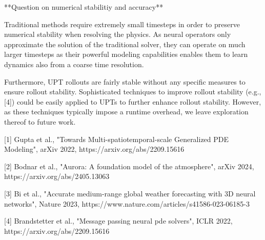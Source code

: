 **Question on numerical stabilitiy and accuracy**

Traditional methods require extremely small timesteps in order to preserve numerical stability when resolving the physics.
As neural operators only approximate the solution of the traditional solver, they can operate on much larger timesteps as their powerful modeling capabilities enables them to learn dynamics also from a coarse time resolution.


Furthermore, UPT rollouts are fairly stable without any specific measures to ensure rollout stability. Sophisticated techniques to improve rollout stability (e.g., [4]) could be easily applied to UPTs to further enhance rollout stability. However, as these techniques typically impose a runtime overhead, we leave exploration thereof to future work.


[1] Gupta et al., "Towards Multi-spatiotemporal-scale Generalized PDE Modeling", arXiv 2022, https://arxiv.org/abs/2209.15616

[2] Bodnar et al., "Aurora: A foundation model of the atmosphere", arXiv 2024, https://arxiv.org/abs/2405.13063

[3] Bi et al., "Accurate medium-range global weather forecasting with 3D neural networks", Nature 2023, https://www.nature.com/articles/s41586-023-06185-3


[4] Brandstetter et al., "Message passing neural pde solvers", ICLR 2022, https://arxiv.org/abs/2209.15616




